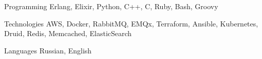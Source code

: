 

\begin{cvskills}

  \cvskill
    {Programming} %
    {Erlang, Elixir, Python, C++, C, Ruby, Bash, Groovy} %

  \cvskill
    {Technologies} %
    {AWS, Docker, RabbitMQ, EMQx, Terraform, Ansible, Kubernetes, Druid, Redis, Memcached, ElasticSearch} %

  \cvskill
    {Languages} %
    {Russian, English} %

\end{cvskills}
